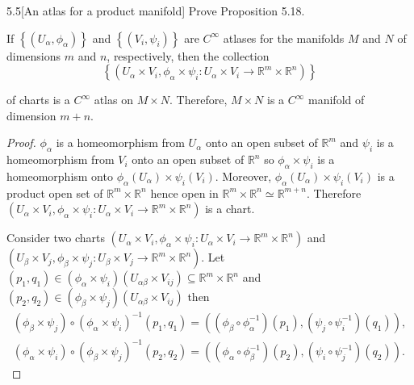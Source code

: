 \begin{problem}{5.5}[An atlas for a product manifold]\label{problem:5.5}
Prove Proposition 5.18.

If \( \left\{ (U_{\alpha}, \phi_{\alpha}) \right\} \) and \( \left\{ (V_{i}, \psi_{i}) \right\} \) are \( C^{\infty} \) atlases for the manifolds \( M \) and \( N \) of dimensions \( m \) and \( n \), respectively, then the collection
\[
	\left\{ (U_{\alpha} \times V_{i}, \phi_{\alpha} \times \psi_{i}: U_{\alpha} \times V_{i} \to \mathbb{R}^{m} \times \mathbb{R}^{n}) \right\}
\]

of charts is a \( C^{\infty} \) atlas on \( M\times N \). Therefore, \( M\times N \) is a \( C^{\infty} \) manifold of dimension \( m + n \).
\end{problem}

\begin{proof}
	\( \phi_{\alpha} \) is a homeomorphism from \( U_{\alpha} \) onto an open subset of \( \mathbb{R}^{m} \) and \( \psi_{i} \) is a homeomorphism from \( V_{i} \) onto an open subset of \( \mathbb{R}^{n} \) so \( \phi_{\alpha} \times \psi_{i} \) is a homeomorphism onto \( \phi_{\alpha}(U_{\alpha}) \times \psi_{i}(V_{i}) \). Moreover, \( \phi_{\alpha}(U_{\alpha}) \times \psi_{i}(V_{i}) \) is a product open set of \( \mathbb{R}^{m} \times \mathbb{R}^{n} \) hence open in \( \mathbb{R}^{m} \times \mathbb{R}^{n} \simeq \mathbb{R}^{m + n} \). Therefore \( (U_{\alpha} \times V_{i}, \phi_{\alpha} \times \psi_{i}: U_{\alpha} \times V_{i} \to \mathbb{R}^{m} \times \mathbb{R}^{n}) \) is a chart.

	Consider two charts \( (U_{\alpha} \times V_{i}, \phi_{\alpha} \times \psi_{i}: U_{\alpha} \times V_{i} \to \mathbb{R}^{m} \times \mathbb{R}^{n})  \) and \( (U_{\beta} \times V_{j}, \phi_{\beta} \times \psi_{j}: U_{\beta} \times V_{j} \to \mathbb{R}^{m} \times \mathbb{R}^{n}) \). Let \( (p_{1}, q_{1}) \in (\phi_{\alpha} \times \psi_{i})(U_{\alpha\beta} \times V_{ij}) \subseteq \mathbb{R}^{m} \times \mathbb{R}^{n} \) and \( (p_{2}, q_{2}) \in (\phi_{\beta} \times \psi_{j})(U_{\alpha\beta} \times V_{ij}) \) then
	\[
		\begin{split}
			{(\phi_{\beta} \times \psi_{j})} \circ {(\phi_{\alpha} \times \psi_{i})}^{-1}(p_{1}, q_{1}) = ((\phi_{\beta} \circ \phi_{\alpha}^{-1})(p_{1}), (\psi_{j} \circ \psi_{i}^{-1})(q_{1})), \\
			{(\phi_{\alpha} \times \psi_{i})} \circ {(\phi_{\beta} \times \psi_{j})}^{-1}(p_{2}, q_{2}) = ((\phi_{\alpha} \circ \phi_{\beta}^{-1})(p_{2}), (\psi_{i} \circ \psi_{j}^{-1})(q_{2})).
		\end{split}
	\]


\end{proof}
